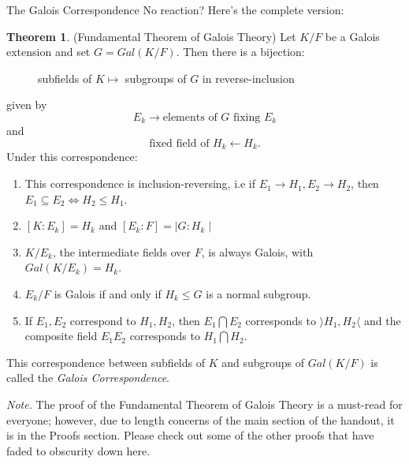 \documentclass[12pt]{article}
\theoremstyle{definition}
\theoremstyle{definition}
\theoremstyle{definition}
\theoremstyle{definition}
\newtheorem{theorem}{Theorem}[section]
\theoremstyle{definition}
\theoremstyle{definition}
\theoremstyle{definition}
\begin{document}
\begin{section}{The Galois Correspondence}
    No reaction? Here's the complete version:
    \begin{theorem}{(Fundamental Theorem of Galois Theory)}
        Let \(K/F\) be a Galois extension and set \(G=Gal(K/F)\). Then there is a bijection:
        \begin{figure}[H]
        \centering
        \caption{subfields of \(K \mapsto\) subgroups of \(G\) in reverse-inclusion}
    \end{figure}
    given by 
    \[E_k \rightarrow \text{elements of } G \text{ fixing } E_k\]
    and 
    \[\text{fixed field of } H_k \leftarrow H_k.\]
    Under this correspondence:
    \begin{enumerate}
        \item This correspondence is inclusion-reversing, i.e if \(E_1 \to H_1, E_2 \to H_2\), then \(E_1\subseteq E_2 \Leftrightarrow H_2 \leq H_1.\)
        \item \([K:E_k] = H_k\) and \([E_k:F] = \mid G: H_k\mid\)
        \item \(K/E_k\), the intermediate fields over \(F\), is always Galois, with \(Gal(K/E_k) = H_k.\)
        \item \(E_k/F\) is Galois if and only if \(H_k \leq G\) is a normal subgroup.
        \item If \(E_1, E_2\) correspond to \(H_1, H_2\), then \(E_1 \bigcap E_2\) corresponds to \(\rangle H_1, H_2 \langle\) and the composite field 
        \(E_1E_2\) corresponds to \(H_1 \bigcap H_2.\)\\
    \end{enumerate}
    This correspondence between subfields of \(K\) and subgroups of \(Gal(K/F)\) is called the \textit{Galois Correspondence}.
    \end{theorem}
    \textit{Note.} The proof of the Fundamental Theorem of Galois Theory is a must-read for everyone; however, due to length concerns of the main section 
    of the handout, it is in the Proofs section. Please check out some of the other proofs that have faded to obscurity down here.
\end{section}
\end{document}
